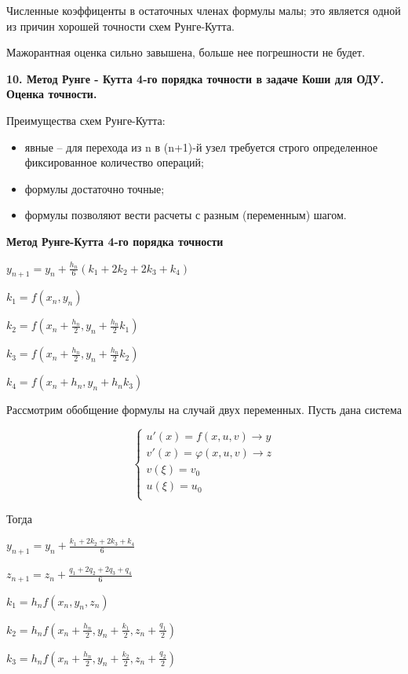 \documentclass[a4paper,14pt]{article}
\begin{document}
Численные коэффиценты в остаточных членах формулы малы;
это является одной из причин хорошей точности схем Рунге-Кутта.

Мажорантная оценка сильно завышена, больше нее погрешности не будет.

\textbf{10. Метод Рунге - Кутта 4-го порядка точности в задаче Коши для  ОДУ.  Оценка точности.}

Преимущества схем Рунге-Кутта:

\begin{itemize}
	\item явные -- для перехода из n в (n+1)-й узел требуется строго определенное фиксированное количество операций;
	\item формулы достаточно точные;
	\item формулы позволяют вести расчеты с разным (переменным) шагом.
\end{itemize}

\textbf{Метод Рунге-Кутта 4-го порядка точности}

$y_{n+1} = y_n + \frac{h_n}{6} (k_1 + 2 k_2 + 2k_3 + k_4)$

$k_1 = f(x_n, y_n)$

$k_2 = f(x_n + \frac{h_n}{2}, y_n + \frac{h_n}{2}k_1)$

$k_3 = f(x_n + \frac{h_n}{2}, y_n + \frac{h_n}{2}k_2)$

$k_4 = f(x_n + h_n, y_n + h_n k_3)$

Рассмотрим обобщение формулы на случай двух переменных. Пусть дана система

\begin{equation*}
 \begin{cases}
   u'(x) = f(x, u, v) \rightarrow y \\
   v'(x) = \varphi(x, u, v) \rightarrow z \\
   v(\xi) = v_0 \\
   u(\xi) = u_0 \\
 \end{cases}
\end{equation*}

Тогда

$y_{n+1} = y_n + \frac{k_1 + 2k_2 + 2k_3 + k_4}{6}$

$z_{n+1} = z_n + \frac{q_1 + 2q_2 + 2q_3 + q_4}{6}$

$k_1 = h_n f(x_n, y_n, z_n)$

$k_2 = h_n f(x_n + \frac{h_n}{2}, y_n + \frac{k_1}{2}, z_n + \frac{q_1}{2})$

$k_3 = h_n f(x_n + \frac{h_n}{2}, y_n + \frac{k_2}{2}, z_n + \frac{q_2}{2})$
\end{document}
